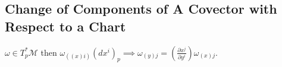 \documentclass[10pt, oneside]{article}
\newcommand{\M}{\mathcal{M}}
\begin{document}
   \subsection{Change of Components of A Covector with Respect to a Chart}
   $\omega \in T_p^* \M$ then $\omega_{((x)i)} (dx^i)_p \implies \omega_{(y)j}= (\frac{\partial x^j}{\partial y^i}) \omega_{(x)j}$.
\end{document}
